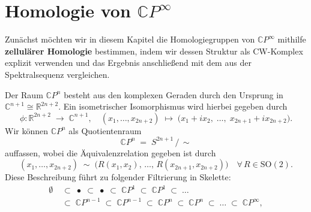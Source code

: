 \documentclass[12pt]{article}
\numberwithin{conj}{section}
\begin{document}
                \section{Homologie von $\mathbb{C}P^\infty$}
                \noindent
                Zunächst möchten wir in diesem Kapitel die Homologiegruppen von \(\mathbb{C}P^\infty\) mithilfe \textbf{zellulärer Homologie} bestimmen, indem wir dessen Struktur als CW-Komplex explizit verwenden und das Ergebnis anschließend mit dem aus der Spektralsequenz vergleichen. 
                
                Der Raum \(\mathbb{C}P^n\) besteht aus den komplexen Geraden durch den Ursprung in \(\mathbb{C}^{n+1} \cong \mathbb{R}^{2n+2}\). Ein isometrischer Isomorphismus wird hierbei gegeben durch
                \[
                    \phi \colon \mathbb{R}^{2n+2} \;\longrightarrow\; \mathbb{C}^{n+1},
                    \quad
                    (x_1, \dots, x_{2n+2})
                    \;\mapsto\;
                    \bigl(x_1 + i x_2,\; \dots,\; x_{2n+1} + i x_{2n+2}\bigr).
                \]
                Wir können \(\mathbb{C}P^n\) als Quotientenraum
                \[
                    \mathbb{C}P^n \;=\; S^{2n+1} \,/\,\sim
                \]
                auffassen, wobei die Äquivalenzrelation gegeben ist durch
                \[
                    (x_1, \ldots, x_{2n+2})
                    \;\sim\;
                    \bigl(R(x_1,x_2),\,\dots,\,R(x_{2n+1},x_{2n+2})\bigr)
                    \quad
                    \forall\, R \in \mathrm{SO}(2).
                \]
                Diese Beschreibung führt zu folgender Filtrierung in Skelette:
                \begin{align*}
                    \emptyset
                      & \;\subset\; 
                    \bullet
                    \;\subset\;
                    \bullet
                    \;\subset\;
                    \mathbb{C}P^1
                    \;\subset\;
                    \mathbb{C}P^1
                    \;\subset\;
                    \dots\\
                      & \;\subset\; 
                    \mathbb{C}P^{n-1}
                    \;\subset\;
                    \mathbb{C}P^{n-1}
                    \;\subset\;
                    \mathbb{C}P^n
                    \;\subset\;
                    \mathbb{C}P^n
                    \;\subset\;
                    \dots
                    \;\subset\;
                    \mathbb{C}P^\infty,
                \end{align*}
\end{document}
